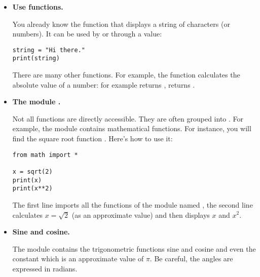 \documentclass[11pt,class=report,crop=false]{standalone}
\begin{document}
\begin{cours}
\sauteligne
\begin{itemize}
  \item \textbf{Use \Python{} functions.}
  
  You already know the  function that displays a string of characters (or numbers). It can be used by  or through a value: 
\begin{center}
\begin{minipage}{0.5\textwidth}
\begin{lstlisting}  
string = "Hi there."
print(string)
\end{lstlisting}
\end{minipage}
\end{center} 	 

  There are many other functions. For example, the function  calculates the absolute value of a number: for example  returns ,  returns .

  \item \textbf{The module .}

	Not all functions are directly accessible. They are often grouped into . For example, the  module contains mathematical functions. For instance, you will find the square root function . Here's how to use it: 
\begin{center}
\begin{minipage}{0.5\textwidth}
\begin{lstlisting} 
from math import *

x = sqrt(2)
print(x)
print(x**2)
\end{lstlisting}
\end{minipage}

\end{center} 	

The first line imports all the functions of the module named , the second line calculates $x = \sqrt{2}$ (as an approximate value) and then displays $x$ and $x^2$.	

  \item \textbf{Sine and cosine.} 
  
  The  module contains the trigonometric functions sine  and cosine  and even the constant \index{$\pi$} which is an approximate value of $\pi$. Be careful, the angles are expressed in radians.


\end{itemize}
\end{cours}
\end{document}
